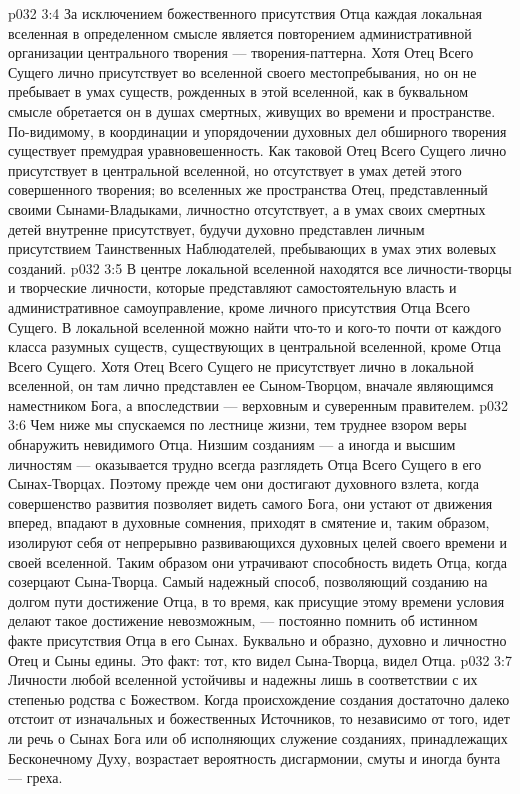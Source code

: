 \vs p032 3:4 \pc За исключением божественного присутствия Отца каждая локальная вселенная в определенном смысле является повторением административной организации центрального творения --- творения\hyp{}паттерна. Хотя Отец Всего Сущего лично присутствует во вселенной своего местопребывания, но он не пребывает в умах существ, рожденных в этой вселенной, как в буквальном смысле обретается он в душах смертных, живущих во времени и пространстве. По\hyp{}видимому, в координации и упорядочении духовных дел обширного творения существует премудрая уравновешенность. Как таковой Отец Всего Сущего лично присутствует в центральной вселенной, но отсутствует в умах детей этого совершенного творения; во вселенных же пространства Отец, представленный своими Сынами\hyp{}Владыками, личностно отсутствует, а в умах своих смертных детей внутренне присутствует, будучи духовно представлен личным присутствием Таинственных Наблюдателей, пребывающих в умах этих волевых созданий.
\vs p032 3:5 В центре локальной вселенной находятся все личности\hyp{}творцы и творческие личности, которые представляют самостоятельную власть и административное самоуправление, кроме личного присутствия Отца Всего Сущего. В локальной вселенной можно найти что\hyp{}то и кого\hyp{}то почти от каждого класса разумных существ, существующих в центральной вселенной, кроме Отца Всего Сущего. Хотя Отец Всего Сущего не присутствует лично в локальной вселенной, он там лично представлен ее Сыном\hyp{}Творцом, вначале являющимся наместником Бога, а впоследствии --- верховным и суверенным правителем.
\vs p032 3:6 Чем ниже мы спускаемся по лестнице жизни, тем труднее взором веры обнаружить невидимого Отца. Низшим созданиям --- а иногда и высшим личностям --- оказывается трудно всегда разглядеть Отца Всего Сущего в его Сынах\hyp{}Творцах. Поэтому прежде чем они достигают духовного взлета, когда совершенство развития позволяет видеть самого Бога, они устают от движения вперед, впадают в духовные сомнения, приходят в смятение и, таким образом, изолируют себя от непрерывно развивающихся духовных целей своего времени и своей вселенной. Таким образом они утрачивают способность видеть Отца, когда созерцают Сына\hyp{}Творца. Самый надежный способ, позволяющий созданию на долгом пути достижение Отца, в то время, как присущие этому времени условия делают такое достижение невозможным, --- постоянно помнить об истинном факте присутствия Отца в его Сынах. Буквально и образно, духовно и личностно Отец и Сыны едины. Это факт: тот, кто видел Сына\hyp{}Творца, видел Отца.
\vs p032 3:7 \pc Личности любой вселенной устойчивы и надежны лишь в соответствии с их степенью родства с Божеством. Когда происхождение создания достаточно далеко отстоит от изначальных и божественных Источников, то независимо от того, идет ли речь о Сынах Бога или об исполняющих служение созданиях, принадлежащих Бесконечному Духу, возрастает вероятность дисгармонии, смуты и иногда бунта --- греха.
